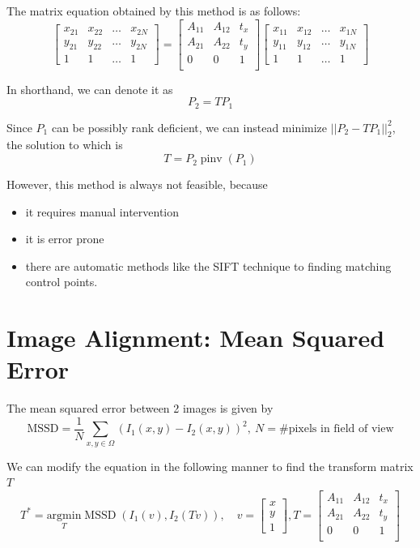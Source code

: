 \documentclass{report}
\begin{document}
The matrix equation obtained by this method is as follows:
$$
  \begin{bmatrix}
    x_{21} & x_{22} & \ldots & x_{2N} \\
    y_{21} & y_{22} & \ldots & y_{2N} \\
    1      & 1      & \ldots & 1
  \end{bmatrix} =
  \begin{bmatrix}
    A_{11} & A_{12} & t_x \\
    A_{21} & A_{22} & t_y \\
    0      & 0      & 1   \\
  \end{bmatrix}
  \begin{bmatrix}
    x_{11} & x_{12} & \ldots & x_{1N} \\
    y_{11} & y_{12} & \ldots & y_{1N} \\
    1      & 1      & \ldots & 1
  \end{bmatrix}
$$

In shorthand, we can denote it as
$$
  P_2 = TP_1
$$

Since $P_1$ can be possibly rank deficient, we can instead minimize $||P_2-TP_1||^2_2$, the solution to which is
$$
  T = P_2 \operatorname{pinv}(P_1)
$$

However, this method is always not feasible, because
\begin{itemize}
  \item it requires manual intervention
  \item it is error prone
  \item there are automatic methods like the SIFT technique to finding matching control points.
\end{itemize}

\section{Image Alignment: Mean Squared Error}

The mean squared error between 2 images is given by
$$
  \text{MSSD} = \frac{1}{N} \underset{x,y\in\Omega}{\sum} (I_1(x,y)-I_2(x,y))^2, \ N = \#\text{pixels in field of view}
$$

We can modify the equation in the following manner to find the transform matrix $T$
$$
  T^* = \underset{T}{\text{argmin}} \operatorname{MSSD}(I_1(v), I_2(Tv)), \quad
  v = \begin{bmatrix}
    x \\
    y \\
    1
  \end{bmatrix},
  T = \begin{bmatrix}
    A_{11} & A_{12} & t_x \\
    A_{21} & A_{22} & t_y \\
    0      & 0      & 1   \\
  \end{bmatrix}
$$
\end{document}
